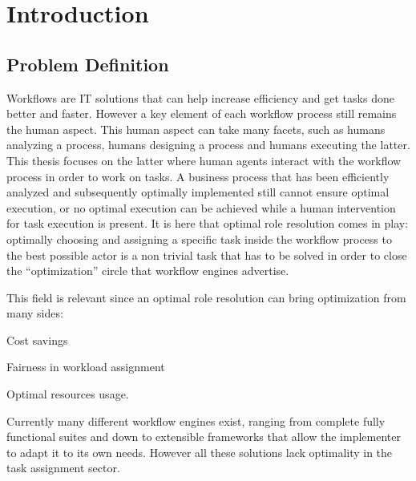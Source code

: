 \documentclass{seal_thesis}
\begin{document}
\begin{zusammenfassung}
\end{zusammenfassung}

\tableofcontents

\clearpage

\listoffigures

\clearpage

\listoftables

\mainmatter

\glsresetall

\chapter{Introduction}
\label{ch:intro}

\section{Problem Definition}

Workflows are IT solutions that can help increase efficiency and get tasks done better and faster. However a key element of each workflow process still remains the human aspect. This human aspect can take many facets, such as humans analyzing a process, humans designing a process and humans executing the latter. This thesis focuses on the latter \ie where human agents interact with the workflow process in order to work on tasks. A business process that has been efficiently analyzed and subsequently optimally implemented still cannot ensure optimal execution, or no optimal execution can be achieved while a human intervention for task execution is present. It is here that optimal role resolution comes in play: optimally choosing and assigning a specific task inside the workflow process to the best possible actor is a non trivial task that has to be solved in order to close the ``optimization'' circle that workflow engines advertise.

This field is relevant since an optimal role resolution can bring optimization from many sides:
\begin{enumerate*}
	\item Cost savings
	\item Fairness in workload assignment
	\item Optimal resources usage.
\end{enumerate*}

Currently many different workflow engines exist, ranging from complete fully functional suites and down to extensible frameworks that allow the implementer to adapt it to its own needs. However all these solutions lack optimality in the task assignment sector.
\end{document}
